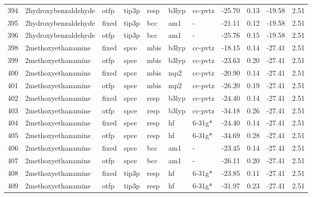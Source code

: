 \begin{tabular}{lllllllrrrr}
394 &          2hydroxybenzaldehyde &   otfp &  tip3p &   resp &   b3lyp &      cc-pvtz &      -25.70 &     0.13 &      -19.58 &      2.51 \\
395 &          2hydroxybenzaldehyde &  fixed &  tip3p &    bcc &     am1 &            - &      -21.11 &     0.12 &      -19.58 &      2.51 \\
396 &          2hydroxybenzaldehyde &   otfp &  tip3p &    bcc &     am1 &            - &      -25.76 &     0.15 &      -19.58 &      2.51 \\
398 &            2methoxyethanamine &  fixed &   spce &   mbis &   b3lyp &      cc-pvtz &      -18.15 &     0.14 &      -27.41 &      2.51 \\
399 &            2methoxyethanamine &   otfp &   spce &   mbis &   b3lyp &      cc-pvtz &      -23.63 &     0.20 &      -27.41 &      2.51 \\
400 &            2methoxyethanamine &  fixed &   spce &   mbis &     mp2 &      cc-pvtz &      -20.90 &     0.14 &      -27.41 &      2.51 \\
401 &            2methoxyethanamine &   otfp &   spce &   mbis &     mp2 &      cc-pvtz &      -26.20 &     0.19 &      -27.41 &      2.51 \\
402 &            2methoxyethanamine &  fixed &   spce &   resp &   b3lyp &      cc-pvtz &      -24.40 &     0.14 &      -27.41 &      2.51 \\
403 &            2methoxyethanamine &   otfp &   spce &   resp &   b3lyp &      cc-pvtz &      -34.18 &     0.26 &      -27.41 &      2.51 \\
404 &            2methoxyethanamine &  fixed &   spce &   resp &      hf &       6-31g* &      -24.40 &     0.14 &      -27.41 &      2.51 \\
405 &            2methoxyethanamine &   otfp &   spce &   resp &      hf &       6-31g* &      -34.69 &     0.28 &      -27.41 &      2.51 \\
406 &            2methoxyethanamine &  fixed &   spce &    bcc &     am1 &            - &      -23.45 &     0.14 &      -27.41 &      2.51 \\
407 &            2methoxyethanamine &   otfp &   spce &    bcc &     am1 &            - &      -26.11 &     0.20 &      -27.41 &      2.51 \\
408 &            2methoxyethanamine &  fixed &  tip3p &   resp &      hf &       6-31g* &      -23.85 &     0.11 &      -27.41 &      2.51 \\
409 &            2methoxyethanamine &   otfp &  tip3p &   resp &      hf &       6-31g* &      -31.97 &     0.23 &      -27.41 &      2.51 \\

\end{tabular}
